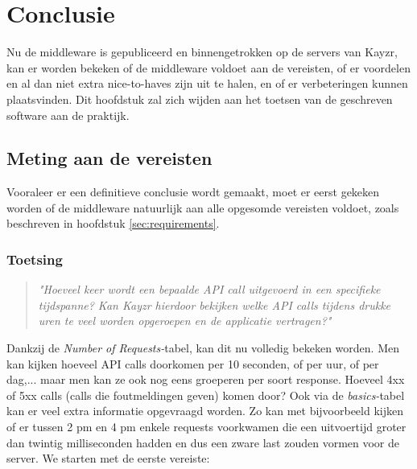 
\chapter{Conclusie}
\label{ch:conclusie}


Nu de middleware is gepubliceerd en binnengetrokken op de servers van Kayzr, kan er worden bekeken of de middleware voldoet aan de vereisten, of er voordelen en al dan niet extra nice-to-haves zijn uit te halen, en of er verbeteringen kunnen plaatsvinden. Dit hoofdstuk zal zich wijden aan het toetsen van de geschreven software aan de praktijk.

\section{Meting aan de vereisten}
\label{sec:reqs}

Vooraleer er een definitieve conclusie wordt gemaakt, moet er eerst gekeken worden of de middleware natuurlijk aan alle opgesomde vereisten voldoet, zoals beschreven in hoofdstuk \ref{sec:requirements}.

\subsection{Toetsing}
\label{sec:testing}

\begin{quote}
	\textit{"Hoeveel keer wordt een bepaalde API call uitgevoerd in een specifieke tijdspanne? Kan Kayzr hierdoor bekijken welke API calls tijdens drukke uren te veel worden opgeroepen en de applicatie vertragen?"}
\end{quote}

Dankzij de \textit{Number of Requests-}tabel, kan dit nu volledig bekeken worden. Men kan kijken hoeveel API calls doorkomen per 10 seconden, of per uur, of per dag,... maar men kan ze ook nog eens groeperen per soort response. Hoeveel 4xx of 5xx calls (calls die foutmeldingen geven) komen door? Ook via de \textit{basics-}tabel kan er veel extra informatie opgevraagd worden. Zo kan met bijvoorbeeld kijken of er tussen 2 pm en 4 pm enkele requests voorkwamen die een uitvoertijd groter dan twintig milliseconden hadden en dus een zware last zouden vormen voor de server. We starten met de eerste vereiste:

